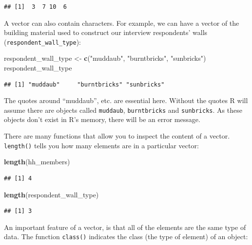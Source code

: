 \documentclass[]{book}
\newenvironment{Shaded}{\begin{snugshade}}{\end{snugshade}}
\newcommand{\KeywordTok}[1]{\textcolor[rgb]{0.13,0.29,0.53}{\textbf{#1}}}
\newcommand{\StringTok}[1]{\textcolor[rgb]{0.31,0.60,0.02}{#1}}
\newcommand{\NormalTok}[1]{#1}
\begin{document}
\begin{verbatim}
## [1]  3  7 10  6
\end{verbatim}

A vector can also contain characters. For example, we can have a vector
of the building material used to construct our interview respondents'
walls (\texttt{respondent\_wall\_type}):

\begin{Shaded}
\begin{Highlighting}[]
\NormalTok{respondent_wall_type <-}\StringTok{ }\KeywordTok{c}\NormalTok{(}\StringTok{"muddaub"}\NormalTok{, }\StringTok{"burntbricks"}\NormalTok{, }\StringTok{"sunbricks"}\NormalTok{)}
\NormalTok{respondent_wall_type}
\end{Highlighting}
\end{Shaded}

\begin{verbatim}
## [1] "muddaub"     "burntbricks" "sunbricks"
\end{verbatim}

The quotes around ``muddaub'', etc. are essential here. Without the
quotes R will assume there are objects called \texttt{muddaub},
\texttt{burntbricks} and \texttt{sunbricks}. As these objects don't
exist in R's memory, there will be an error message.

There are many functions that allow you to inspect the content of a
vector. \texttt{length()} tells you how many elements are in a
particular vector:

\begin{Shaded}
\begin{Highlighting}[]
\KeywordTok{length}\NormalTok{(hh_members)}
\end{Highlighting}
\end{Shaded}

\begin{verbatim}
## [1] 4
\end{verbatim}

\begin{Shaded}
\begin{Highlighting}[]
\KeywordTok{length}\NormalTok{(respondent_wall_type)}
\end{Highlighting}
\end{Shaded}

\begin{verbatim}
## [1] 3
\end{verbatim}

An important feature of a vector, is that all of the elements are the
same type of data. The function \texttt{class()} indicates the class
(the type of element) of an object:
\end{document}
